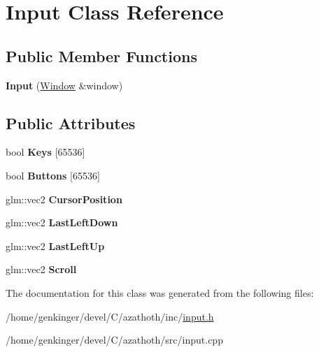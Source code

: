 \hypertarget{classInput}{}\section{Input Class Reference}
\label{classInput}
\subsection*{Public Member Functions}
\begin{DoxyCompactItemize}
\item 
\mbox{\label{classInput_a5fb0b1362c0a62db46e08bb87920f13c}} 
{\bfseries Input} (\mbox{\hyperlink{classWindow}{Window}} \&window)
\end{DoxyCompactItemize}
\subsection*{Public Attributes}
\begin{DoxyCompactItemize}
\item 
\mbox{\label{classInput_af13757a75f15ace39182bd5cd2802f97}} 
bool {\bfseries Keys} \mbox{[}65536\mbox{]}
\item 
\mbox{\label{classInput_a386f9a433b8eb373739271c61d52c86a}} 
bool {\bfseries Buttons} \mbox{[}65536\mbox{]}
\item 
\mbox{\label{classInput_adad1550f636d8bd641b27330c1c3c947}} 
glm\+::vec2 {\bfseries Cursor\+Position}
\item 
\mbox{\label{classInput_ac61867e705a197b5b13404dfbe76fd2a}} 
glm\+::vec2 {\bfseries Last\+Left\+Down}
\item 
\mbox{\label{classInput_a80d983f9bd53ef71f437cb754cd5e678}} 
glm\+::vec2 {\bfseries Last\+Left\+Up}
\item 
\mbox{\label{classInput_ab00ba298dba3e55a90ad1752b7451636}} 
glm\+::vec2 {\bfseries Scroll}
\end{DoxyCompactItemize}


The documentation for this class was generated from the following files\+:\begin{DoxyCompactItemize}
\item 
/home/genkinger/devel/\+C/azathoth/inc/\mbox{\hyperlink{input_8h}{input.\+h}}\item 
/home/genkinger/devel/\+C/azathoth/src/input.\+cpp\end{DoxyCompactItemize}
